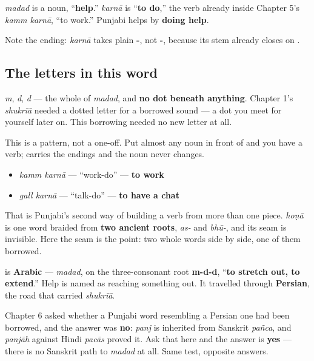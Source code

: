 \textbf{} \emph{madad} is a noun, “\textbf{help}.” \textbf{} \emph{karnā} is “\textbf{to do},” the verb already inside Chapter 5's \textbf{ } \emph{kamm karnā}, “to work.” Punjabi helps by \textbf{doing help}.

Note the ending: \emph{karnā} takes plain \textbf{-}, not \textbf{-}, because its stem already closes on \textbf{}.

\subsection*{The letters in this word}
\textbf{} \emph{m}, \textbf{} \emph{d}, \textbf{} \emph{d} — the whole of \emph{madad}, and \textbf{no dot beneath anything}. Chapter 1's \emph{shukrīā} needed a dotted letter for a borrowed sound — a dot you meet for yourself later on. This borrowing needed no new letter at all.

\begin{grammarlens}[title={Grammar Lens: noun plus \pa{ਕਰਨਾ}}]
This is a pattern, not a one-off. Put almost any noun in front of \textbf{} and you have a verb; \textbf{} carries the endings and the noun never changes.

\begin{itemize}
\raggedright
  \item \textbf{ } \emph{kamm karnā} — “work-do” — \textbf{to work}
  \item \emph{gall karnā} — “talk-do” — \textbf{to have a chat}
\end{itemize}

That is Punjabi's second way of building a verb from more than one piece. \textbf{} \emph{hoṇā} is one word braided from \textbf{two ancient roots}, \emph{as-} and \emph{bhū-}, and its seam is invisible. Here the seam is the point: two whole words side by side, one of them borrowed.
\end{grammarlens}

\begin{cousinweb}
\textbf{} is \textbf{Arabic} — \emph{madad}, on the three-consonant root \textbf{m-d-d}, “\textbf{to stretch out, to extend}.” Help is named as reaching something out. It travelled through \textbf{Persian}, the road that carried \emph{shukrīā}.

Chapter 6 asked whether a Punjabi word resembling a Persian one had been borrowed, and the answer was \textbf{no}: \emph{panj} is inherited from Sanskrit \emph{pañca}, and \emph{panjāh} against Hindi \emph{pacās} proved it. Ask that here and the answer is \textbf{yes} — there is no Sanskrit path to \emph{madad} at all. Same test, opposite answers.
\end{cousinweb}

